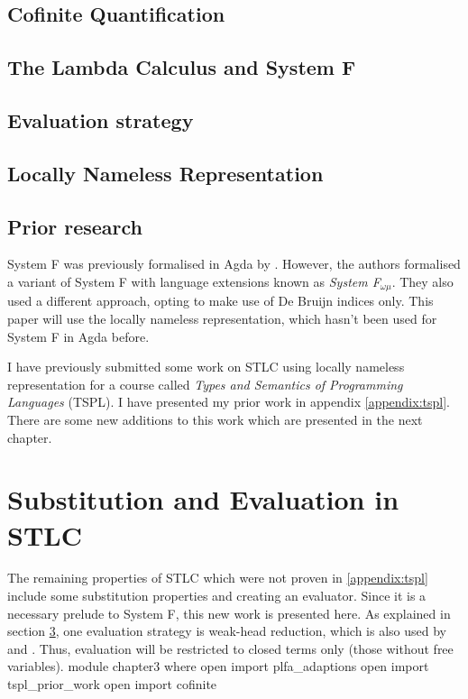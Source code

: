 \documentclass[logo,bsc,singlespacing,parskip,online]{infthesis}
\renewenvironment{code}{\mintedcopy[breaklines,breaksymbolleft=\;]{agda}}{\endmintedcopy}
\begin{document}
\section{Cofinite Quantification}



\section{The Lambda Calculus and System F}


\section{Evaluation strategy}
\label{background:evaluation_strategy}


\section{Locally Nameless Representation}


\section{Prior research}
System F was previously formalised in Agda by \citet{hutton_system_2019}. However, the authors
formalised a variant of System F with language extensions known as \textit{System F$_{\omega \mu}$}.
They also used a different approach, opting to make use of De Bruijn indices only. This paper will
use the locally nameless representation, which hasn't been used for System F in Agda before.

I have previously submitted some work on STLC using locally nameless representation for a course
called \textit{Types and Semantics of Programming Languages} (TSPL). I have presented my prior work
in appendix \ref{appendix:tspl}. There are some new additions to this work which are presented in
the next chapter.

\chapter{Substitution and Evaluation in STLC}
\label{chapter3:stlc_sub_and_eval}
The remaining properties of STLC which were not proven in \ref{appendix:tspl} include some
substitution properties and creating an evaluator. Since it is a necessary prelude to System F, this
new work is presented here. As explained in section \ref{background:evaluation_strategy}, one
evaluation strategy is weak-head reduction, which is also used by
\citet[chapter~Properties]{wadler_programming_2022} and \citet[section~5]{chargueraud_locally_2012}.
Thus, evaluation will be restricted to closed terms only (those without free variables).
\begin{code}
module chapter3 where
  open import plfa_adaptions
  open import tspl_prior_work
  open import cofinite
\end{code}
\end{document}
